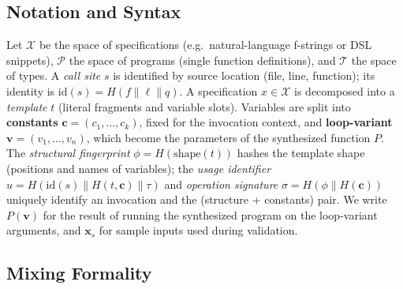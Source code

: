 %
%



\subsection{Notation and Syntax}
\label{sec:abbrev-notation}

Let $\mathcal{X}$ be the space of specifications (e.g.\ natural-language
f-strings or DSL snippets), $\mathcal{P}$ the space of programs (single
function definitions), and $\mathcal{T}$ the space of types.  A
\emph{call site} $s$ is identified by source location (file, line, function);
its identity is $\mathrm{id}(s) = H(f \| \ell \| q)$.  A specification
$x \in \mathcal{X}$ is decomposed into a \emph{template} $t$ (literal
fragments and variable slots).  Variables are split into \textbf{constants}
$\mathbf{c} = (c_1,\dots,c_k)$, fixed for the invocation context, and
\textbf{loop-variant} $\mathbf{v} = (v_1,\dots,v_n)$, which become the
parameters of the synthesized function $P$.  The \emph{structural fingerprint}
$\phi = H(\mathrm{shape}(t))$ hashes the template shape (positions and names of
variables); the \emph{usage identifier} $u = H(\mathrm{id}(s) \| H(t,\mathbf{c}) \| \tau)$
and \emph{operation signature} $\sigma = H(\phi \| H(\mathbf{c}))$ uniquely
identify an invocation and the (structure + constants) pair.  We write
$P(\mathbf{v})$ for the result of running the synthesized program on the
loop-variant arguments, and $\mathbf{x}_s$ for sample inputs used during
validation.



\subsection{Mixing Formality}
\label{sec:abbrev-formality}

